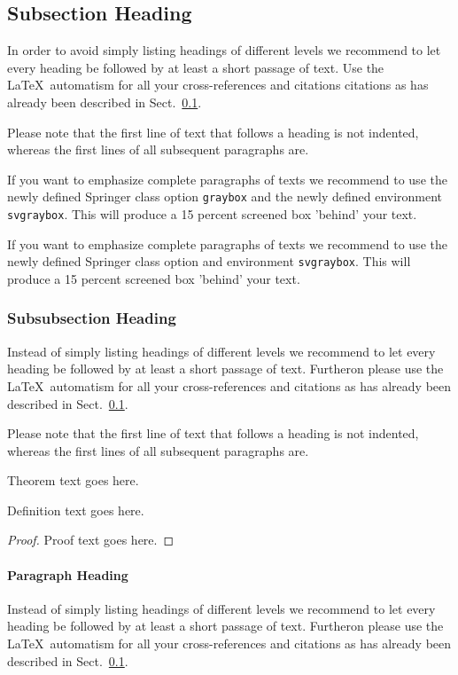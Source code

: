 \documentclass[graybox,envcountchap,sectrefs]{svmono}
\begin{document}
\subsection{Subsection Heading} \label{sec:2}
In order to avoid simply listing headings of different levels we recommend to let every heading be followed by at least a short passage of text. Use the \LaTeX\ automatism for all your cross-references and citations citations as has already been described in Sect.~\ref{sec:2}.

Please note that the first line of text that follows a heading is not indented, whereas the first lines of all subsequent paragraphs are.

\begin{svgraybox}
	If you want to emphasize complete paragraphs of texts we recommend to use the newly defined Springer class option \verb|graybox| and the newly defined environment \verb|svgraybox|. This will produce a 15 percent screened box 'behind' your text.
	
	If you want to emphasize complete paragraphs of texts we recommend to use the newly defined Springer class option and environment \verb|svgraybox|. This will produce a 15 percent screened box 'behind' your text.
\end{svgraybox}


\subsubsection{Subsubsection Heading}
Instead of simply listing headings of different levels we recommend to let every heading be followed by at least a short passage of text. Furtheron please use the \LaTeX\ automatism for all your cross-references and citations as has already been described in Sect.~\ref{sec:2}.

Please note that the first line of text that follows a heading is not indented, whereas the first lines of all subsequent paragraphs are.

\begin{theorem}
Theorem text goes here.
\end{theorem}
%
%
\begin{definition}
Definition text goes here.
\end{definition}

\begin{proof}
	Proof text goes here.
\end{proof}

\paragraph{Paragraph Heading} %
Instead of simply listing headings of different levels we recommend to let every heading be followed by at least a short passage of text. Furtheron please use the \LaTeX\ automatism for all your cross-references and citations as has already been described in Sect.~\ref{sec:2}.
\end{document}
